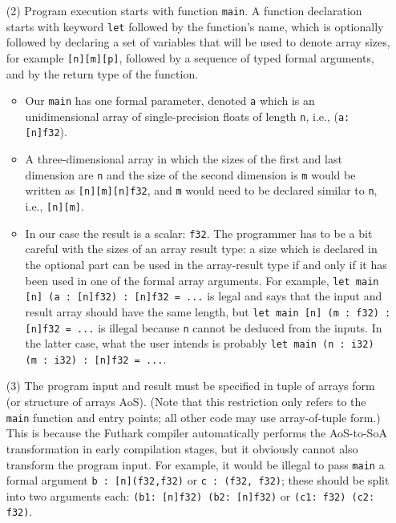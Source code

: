 \documentclass[acmsmall,review]{acmart}\settopmatter{printfolios=true,printccs=false,printacmref=false}
\begin{document}
\begin{itemize}
    \item[(2)] Program execution starts with function {\tt main}.
          A function declaration starts with keyword \lstinline{let}
            followed by the function's name, which is optionally
            followed by declaring a set of variables that will be used
            to denote array sizes, for example \lstinline{[n][m][p]},
            followed by a sequence of typed formal arguments,
            and by the return type of the function.
        \begin{itemize}
          \item Our \lstinline{main} has one formal parameter, denoted
            {\tt a} which is an unidimensional array of single-precision 
            floats of length {\tt n}, i.e., (\lstinline{a: [n]f32}).   
          \item A three-dimensional array
            in which the sizes of the first and last dimension are {\tt n}
            and the size of the second dimension is {\tt m} would
            be written as \lstinline{[n][m][n]f32}, and {\tt m} would
            need to be declared similar to {\tt n}, i.e., {\tt [n][m]}.   
          \item In our case the result is a scalar: {\tt f32}.
                The programmer has to be a bit careful with the
                sizes of an array result type: a size which is declared
                in the optional part can be used in the array-result
                type if and only if it has been used in one of the
                formal array arguments. For example,
                \lstinline{let main [n] (a : [n]f32) : [n]f32 = ...}
                is legal and says that the input and result array should
                have the same length, but 
                \lstinline{let main [n] (m : f32) : [n]f32 = ...} is
                illegal because {\tt n} cannot be deduced from the inputs.
                In the latter case, what the user intends is probably 
                \lstinline{let main (n : i32) (m : i32) : [n]f32 = ...}.
        \end{itemize}
    \item[(3)] The program input and result  
            must be specified in tuple of arrays form (or structure of arrays AoS).
            (Note that this restriction only refers to the {\tt main} function   
            and entry points; all other code may use array-of-tuple form.)
            This is because the Futhark compiler automatically performs
            the AoS-to-SoA transformation in early compilation stages,
            but it obviously cannot also transform the program input.
            For example, it would be illegal to pass {\tt main}
            a formal argument \lstinline{b : [n](f32,f32)} or \lstinline{c : (f32, f32)}; 
            these should be split into two arguments each: 
            \lstinline{(b1: [n]f32) (b2: [n]f32)} or \lstinline{(c1: f32) (c2: f32)}.


\end{itemize}
\end{document}
